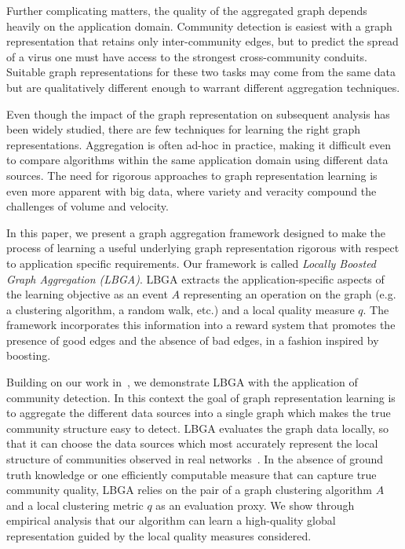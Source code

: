 \documentclass{article}
\begin{document}
Further complicating matters, the quality of the aggregated graph depends
heavily on the application domain. Community detection is easiest with a graph
representation that retains only inter-community edges, but to predict the
spread of a virus one must have access to the strongest cross-community
conduits. Suitable graph representations for these two tasks may come from the
same data but are qualitatively different enough to warrant different
aggregation techniques. 

Even though the impact of the graph representation on subsequent analysis has
been widely studied, there are few techniques for learning the right graph
representations. Aggregation is often ad-hoc in practice, making it difficult
even to compare algorithms within the same application domain using different
data sources. The need for rigorous approaches to graph representation learning
is even more apparent with big data, where variety and veracity compound the
challenges of volume and velocity.

In this paper, we present a graph aggregation framework designed to make the
process of learning a useful underlying graph representation rigorous with respect
to application specific requirements. Our framework is called \emph{Locally
Boosted Graph Aggregation (LBGA)}. LBGA extracts the application-specific
aspects of the learning objective as an event $A$ representing an operation on
the graph (e.g. a clustering algorithm, a random walk, etc.) and a local
quality measure $q$. The framework incorporates this information into a
reward system that promotes the presence of good edges and the absence of bad
edges, in a fashion inspired by boosting.

Building on our work in~\cite{CCK14}, we demonstrate LBGA with the application
of community detection. In this context the goal of graph representation
learning is to aggregate the different data sources into a single graph which
makes the true community structure easy to detect.  LBGA evaluates the graph
data locally, so that it can choose the data sources which most accurately
represent the local structure of communities observed in real
networks~\cite{Aggarwal2011,Leskovec2008}. In the absence of ground truth
knowledge or one efficiently computable measure that can capture true community
quality, LBGA relies on the pair of a graph clustering algorithm $A$ and a
local clustering metric $q$ as an evaluation proxy.  We show through empirical
analysis that our algorithm can learn a high-quality global representation
guided by the local quality measures considered. 
\end{document}
